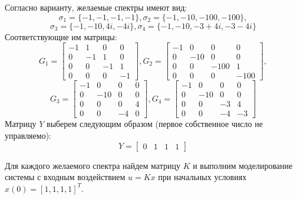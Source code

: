 Согласно варианту, желаемые спектры имеют вид:
\begin{equation*}
    \sigma_1 = \{-1,-1,-1,-1\}, \sigma_2 = \{-1,-10,-100,-100\}, 
\end{equation*}
\begin{equation*}
    \sigma_3 = \{-1,-10,4i,-4i\}, \sigma_4 = \{-1,-10,-3+4i,-3-4i\}
\end{equation*}
Соответствующие им матрицы:
\begin{equation*}
    G_1 = \begin{bmatrix}
        -1 & 1 & 0 & 0 \\
        0 & -1 & 1 & 0 \\
        0 & 0 & -1 & 1 \\
        0 & 0 & 0 & -1
    \end{bmatrix},
    G_2 = \begin{bmatrix}
        -1 & 0 & 0 & 0 \\
        0 & -10 & 0 & 0 \\
        0 & 0 & -100 & 1 \\
        0 & 0 & 0 & -100
    \end{bmatrix},
\end{equation*}
\begin{equation*}
    G_3 = \begin{bmatrix}
        -1 & 0 & 0 & 0 \\
        0 & -10 & 0 & 0 \\
        0 & 0 & 0 & 4 \\
        0 & 0 & -4 & 0
    \end{bmatrix},
    G_4 = \begin{bmatrix}
        -1 & 0 & 0 & 0 \\
        0 & -10 & 0 & 0 \\
        0 & 0 & -3 & 4 \\
        0 & 0 & -4 & -3
    \end{bmatrix}
\end{equation*}
Матрицу $Y$ выберем следующим образом (первое собственное число не управляемо):
\begin{equation*}
    Y = \begin{bmatrix}
        0 & 1 & 1 & 1
    \end{bmatrix}
\end{equation*}

Для каждого желаемого спектра найдем матрицу $K$ и выполним моделирование системы с 
входным воздействием $u = Kx$ при начальных условиях $x(0)=[1, 1, 1, 1]^T$.

